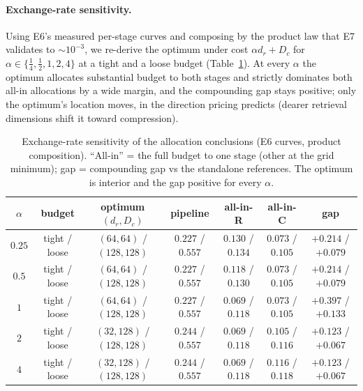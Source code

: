 \documentclass{article}
\newcommand{\dr}{d_r}
\begin{document}
\paragraph{Exchange-rate sensitivity.} Using E6's measured per-stage curves and composing by the
product law that E7 validates to ${\sim}10^{-3}$, we re-derive the optimum under cost
$\alpha\dr+D_c$ for $\alpha\in\{\tfrac14,\tfrac12,1,2,4\}$ at a tight and a loose budget
(Table~\ref{tab:alpha}). At every $\alpha$ the optimum allocates substantial budget to both stages
and strictly dominates both all-in allocations by a wide margin, and the compounding gap stays
positive; only the optimum's location moves, in the direction pricing predicts (dearer retrieval
dimensions shift it toward compression).

\begin{table}[h]
\caption{Exchange-rate sensitivity of the allocation conclusions (E6 curves, product composition).
``All-in'' = the full budget to one stage (other at the grid minimum); gap = compounding gap vs
the standalone references. The optimum is interior and the gap positive for every $\alpha$.}
\label{tab:alpha}
\centering\small
\begin{tabular}{@{}ccccccc@{}}
\toprule
$\alpha$ & budget & optimum $(\dr,D_c)$ & pipeline & all-in-R & all-in-C & gap\\
\midrule
$0.25$ & tight / loose & $(64,64)$ / $(128,128)$ & $0.227$ / $0.557$ & $0.130$ / $0.134$ & $0.073$ / $0.105$ & $+0.214$ / $+0.079$\\
$0.5$  & tight / loose & $(64,64)$ / $(128,128)$ & $0.227$ / $0.557$ & $0.118$ / $0.130$ & $0.073$ / $0.105$ & $+0.214$ / $+0.079$\\
$1$    & tight / loose & $(64,64)$ / $(128,128)$ & $0.227$ / $0.557$ & $0.069$ / $0.118$ & $0.073$ / $0.105$ & $+0.397$ / $+0.133$\\
$2$    & tight / loose & $(32,128)$ / $(128,128)$ & $0.244$ / $0.557$ & $0.069$ / $0.118$ & $0.105$ / $0.116$ & $+0.123$ / $+0.067$\\
$4$    & tight / loose & $(32,128)$ / $(128,128)$ & $0.244$ / $0.557$ & $0.069$ / $0.118$ & $0.116$ / $0.118$ & $+0.123$ / $+0.067$\\
\bottomrule
\end{tabular}
\end{table}
\end{document}
